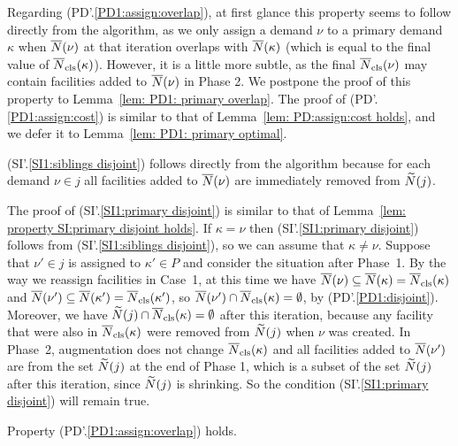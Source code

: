 Regarding (PD'.\ref{PD1:assign:overlap}), at first glance this
property seems to follow directly from the algorithm, as we only
assign a demand $\nu$ to a primary demand $\kappa$ when ${\overline{N}}(\nu)$
at that iteration overlaps with ${\overline{N}}(\kappa)$ (which is equal to
the final value of ${\overline{N}}_{\text{cls}}(\kappa)$).  However, it is a little
more subtle, as the final ${\overline{N}}_{\text{cls}}(\nu)$ may contain facilities
added to ${\overline{N}}(\nu)$ in Phase 2. We postpone the proof of this
property to Lemma~\ref{lem: PD1: primary overlap}.  The proof of
(PD'.\ref{PD1:assign:cost}) is similar to that of Lemma~\ref{lem:
  PD:assign:cost holds}, and we defer it to Lemma~\ref{lem: PD1:
  primary optimal}.

(SI'.\ref{SI1:siblings disjoint}) follows directly from the
algorithm because for each demand $\nu\in j$ all facilities added
to ${\overline{N}}(\nu)$ are immediately removed from ${\widetilde N}(j)$.

The proof of (SI'.\ref{SI1:primary disjoint}) is similar to that of
Lemma~\ref{lem: property SI:primary disjoint holds}. If $\kappa=\nu$
then (SI'.\ref{SI1:primary disjoint}) follows from
(SI'.\ref{SI1:siblings disjoint}), so we can assume that
$\kappa\neq\nu$.  Suppose that $\nu'\in j$ is assigned to $\kappa'\in
P$ and consider the situation after Phase~1. By the way we reassign
facilities in Case~1, at this time we have ${\overline{N}}(\nu)\subseteq
{\overline{N}}(\kappa) = {\overline{N}}_{\text{cls}}(\kappa)$ and ${\overline{N}}(\nu')\subseteq
{\overline{N}}(\kappa') ={\overline{N}}_{\text{cls}}(\kappa')$, so ${\overline{N}}(\nu')\cap
{\overline{N}}_{\text{cls}}(\kappa) = \emptyset$, by (PD'.\ref{PD1:disjoint}).
Moreover, we have ${\widetilde N}(j) \cap {\overline{N}}_{\text{cls}}(\kappa) = \emptyset$
after this iteration, because any facility that were also in
${\overline{N}}_{\text{cls}}(\kappa)$ were removed from ${\widetilde N}(j)$ when $\nu$ was
created. In Phase~2, augmentation does not change ${\overline{N}}_{\text{cls}}(\kappa)$
and all facilities added to ${\overline{N}}(\nu')$ are from the set
${\widetilde N}(j)$ at the end of Phase 1, which is a subset of the set
${\widetilde N}(j)$ after this iteration, since ${\widetilde N}(j)$ is
shrinking. So the condition (SI'.\ref{SI1:primary disjoint}) will
remain true.


\begin{lemma} \label{lem: PD1: primary overlap}
  Property (PD'.\ref{PD1:assign:overlap}) holds.
\end{lemma}

